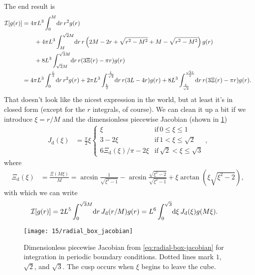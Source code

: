 The end result is
\begin{subequations}
\begin{align}
	\mathcal{I}[g(r)]
	&= 4 \pi L^3 \int_0^M\! \dif r \, r^2 g(r) \notag \\
	&\qquad
		+ 4 \pi L^3 \int_M^{\sqrt{2} M}\! \dif r \, r \left( 2 M - 2 r + \sqrt{r^2 - M^2} + M - \sqrt{r^2 - M^2} \right) g(r) \notag \\
	&\qquad
		+ 8 L^3 \int_{\sqrt{2} M}^{\sqrt{3} M}\! \dif r \, r (3 \Xi(r) - \pi r) g(r) \\
	&= 4 \pi L^3 \int_0^{\frac{L}{2}}\! \dif r \, r^2 g(r)
		+ 2 \pi L^3 \int_{\frac{L}{2}}^{\frac{L}{\sqrt{2}}}\! \dif r \, r (3 L - 4 r) g(r)
		+ 8 L^3 \int_{\frac{L}{\sqrt{2}}}^{\frac{\sqrt{3} L}{2}}\! \dif r \, r (3 \Xi(r) - \pi r) g(r).
\end{align}
\end{subequations}
That doesn't look like the nicest expression in the world, but at least it's in closed form (except for the $r$ integrals, of course).
We can clean it up a bit if we introduce $\xi = r / M$ and the dimensionless piecewise Jacobian (shown in \cref{fig:radial-box-jacobian})
\begin{align}
	J_\mathrm{d}(\xi)
	&= \frac{\pi}{2} \xi \begin{cases}
			\xi & \mathrm{if}\, 0 \le \xi \le 1 \\
			3 - 2 \xi & \mathrm{if}\, 1 < \xi \le \sqrt{2} \\
			6 \Xi_\mathrm{d}(\xi) / \pi - 2 \xi & \mathrm{if}\, \sqrt{2} < \xi \le \sqrt{3}
		\end{cases},
			\label{eq:radial-box-jacobian}
\end{align}
where
\begin{align}
	\Xi_\mathrm{d}(\xi)
	&= \frac{\Xi(M \xi)}{M}
	= \arcsin{\frac{1}{\sqrt{\xi^2 - 1}}}
		- \arcsin{\frac{\sqrt{\xi^2 - 2}}{\sqrt{\xi^2 - 1}}}
		+ \xi \arctan{(\xi \sqrt{\xi^2 - 2})},
			\label{eq:radial-box-jacobian-tail}
\end{align}
with which we can write
\begin{align}
	\mathcal{I}[g(r)]
	&= 2 L^5 \int_0^{\sqrt{3} M}\! \dif r \, J_\mathrm{d}(r / M) g(r)
	= L^6 \int_0^{\sqrt{3}}\! \dif \xi \, J_\mathrm{d}(\xi) g(M \xi).
\end{align}

\begin{figure}
	\centering
	\texttt{[image: 15/radial\_box\_jacobian]}
	\caption[
		Dimensionless piecewise Jacobian for integration in periodic boundary conditions
	]{
		Dimensionless piecewise Jacobian from \cref{eq:radial-box-jacobian} for integration in periodic boundary conditions.
		Dotted lines mark $1$, $\sqrt{2}$, and $\sqrt{3}$.
		The cusp occurs when $\xi$ begins to leave the cube.
	}
	\label{fig:radial-box-jacobian}
\end{figure}

